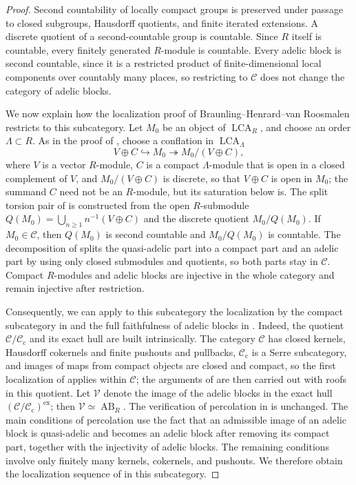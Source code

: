 \begin{proof}
Second countability of locally compact groups is preserved under passage to closed subgroups, Hausdorff quotients, and finite iterated extensions.
A discrete quotient of a second-countable group is countable.
Since $R$ itself is countable, every finitely generated $R$-module is countable.
Every adelic block is second countable, since it is a restricted product of finite-dimensional local components over countably many places, so restricting to $\mathcal C$ does not change the category of adelic blocks.

We now explain how the localization proof of Braunling--Henrard--van Roosmalen restricts to this subcategory.
Let $M_0$ be an object of $\operatorname{LCA}_R$, and choose an order $\Lambda\subset R$.
As in the proof of \cite[Proposition~2.11]{BHRAdeles}, choose a conflation in $\operatorname{LCA}_\Lambda$
\[
 V\oplus C\hookrightarrow M_0\twoheadrightarrow M_0/(V\oplus C),
\]
where $V$ is a vector $R$-module, $C$ is a compact $\Lambda$-module that is open in a closed complement of $V$, and $M_0/(V\oplus C)$ is discrete, so that $V\oplus C$ is open in $M_0$; the summand $C$ need not be an $R$-module, but its saturation below is.
The split torsion pair of \cite[Proposition 2.11]{BHRAdeles} is constructed from the open $R$-submodule $Q(M_0)=\bigcup_{n\ge1}n^{-1}(V\oplus C)$ and the discrete quotient $M_0/Q(M_0)$.
If $M_0\in\mathcal C$, then $Q(M_0)$ is second countable and $M_0/Q(M_0)$ is countable.
The decomposition of \cite[Lemma 2.12]{BHRAdeles} splits the quasi-adelic part into a compact part and an adelic part by using only closed submodules and quotients, so both parts stay in $\mathcal C$.
Compact $R$-modules and adelic blocks are injective in the whole category and remain injective after restriction.

Consequently, we can apply to this subcategory the localization by the compact subcategory in \cite[Proposition 6.3]{BHRAdeles} and the full faithfulness of adelic blocks in \cite[Lemma 6.4]{BHRAdeles}.
Indeed, the quotient $\mathcal C/\mathcal C_{\mathrm c}$ and its exact hull are built intrinsically.
The category $\mathcal C$ has closed kernels, Hausdorff cokernels and finite pushouts and pullbacks, $\mathcal C_{\mathrm c}$ is a Serre subcategory, and images of maps from compact objects are closed and compact, so the first localization of \cite[\S5]{BHRAdeles} applies within $\mathcal C$; the arguments of \cite[Lemma 6.4, Proposition 6.5]{BHRAdeles} are then carried out with roofs in this quotient.
Let $\mathcal V$ denote the image of the adelic blocks in the exact hull $(\mathcal C/\mathcal C_{\mathrm c})^{\mathrm{ex}}$; then $\mathcal V\simeq\operatorname{AB}_R$.
The verification of percolation in \cite[Proposition 6.5]{BHRAdeles} is unchanged.
The main conditions of percolation use the fact that an admissible image of an adelic block is quasi-adelic and becomes an adelic block after removing its compact part, together with the injectivity of adelic blocks.
The remaining conditions involve only finitely many kernels, cokernels, and pushouts.
We therefore obtain the localization sequence of \cite[Corollary 6.6]{BHRAdeles} in this subcategory.


\end{proof}
